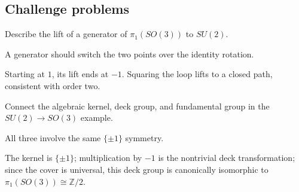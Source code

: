 \subsection*{Challenge problems}

\begin{exercise}\label{exr:viii13-ped-15}
Describe the lift of a generator of $\pi_1(SO(3))$ to $SU(2)$.
\end{exercise}
\begin{hint}
A generator should switch the two points over the identity rotation.
\end{hint}
\begin{solution}
Starting at $1$, its lift ends at $-1$.  Squaring the loop lifts to a closed path, consistent with order two.
\end{solution}

\begin{exercise}\label{exr:viii13-ped-16}
Connect the algebraic kernel, deck group, and fundamental group in the $SU(2)\to SO(3)$ example.
\end{exercise}
\begin{hint}
All three involve the same $\{\pm1\}$ symmetry.
\end{hint}
\begin{solution}
The kernel is $\{\pm1\}$; multiplication by $-1$ is the nontrivial deck transformation; since the cover is universal, this deck group is canonically isomorphic to $\pi_1(SO(3))\cong\mathbb Z/2$.
\end{solution}

